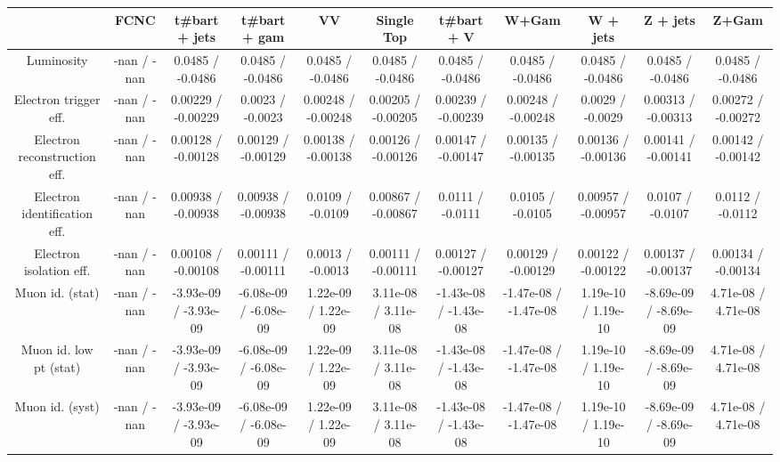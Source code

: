 \begin{table}[htbp]
\begin{center}
\footnotesize
\begin{tabular}{|c|c|c|c|c|c|c|c|c|c|c|}
\hline 
      & FCNC      & t#bar{t} + jets      & t#bar{t} +  gam      & VV      & Single Top      & t#bar{t} + V      & W+Gam      & W + jets      & Z + jets      & Z+Gam \\ 
\hline 
  Luminosity & -nan / -nan & 0.0485 / -0.0486 & 0.0485 / -0.0486 & 0.0485 / -0.0486 & 0.0485 / -0.0486 & 0.0485 / -0.0486 & 0.0485 / -0.0486 & 0.0485 / -0.0486 & 0.0485 / -0.0486 & 0.0485 / -0.0486 \\ 
  Electron trigger eff. & -nan / -nan & 0.00229 / -0.00229 & 0.0023 / -0.0023 & 0.00248 / -0.00248 & 0.00205 / -0.00205 & 0.00239 / -0.00239 & 0.00248 / -0.00248 & 0.0029 / -0.0029 & 0.00313 / -0.00313 & 0.00272 / -0.00272 \\ 
  Electron reconstruction eff. & -nan / -nan & 0.00128 / -0.00128 & 0.00129 / -0.00129 & 0.00138 / -0.00138 & 0.00126 / -0.00126 & 0.00147 / -0.00147 & 0.00135 / -0.00135 & 0.00136 / -0.00136 & 0.00141 / -0.00141 & 0.00142 / -0.00142 \\ 
  Electron identification eff. & -nan / -nan & 0.00938 / -0.00938 & 0.00938 / -0.00938 & 0.0109 / -0.0109 & 0.00867 / -0.00867 & 0.0111 / -0.0111 & 0.0105 / -0.0105 & 0.00957 / -0.00957 & 0.0107 / -0.0107 & 0.0112 / -0.0112 \\ 
  Electron isolation eff. & -nan / -nan & 0.00108 / -0.00108 & 0.00111 / -0.00111 & 0.0013 / -0.0013 & 0.00111 / -0.00111 & 0.00127 / -0.00127 & 0.00129 / -0.00129 & 0.00122 / -0.00122 & 0.00137 / -0.00137 & 0.00134 / -0.00134 \\ 
  Muon id. (stat) & -nan / -nan & -3.93e-09 / -3.93e-09 & -6.08e-09 / -6.08e-09 & 1.22e-09 / 1.22e-09 & 3.11e-08 / 3.11e-08 & -1.43e-08 / -1.43e-08 & -1.47e-08 / -1.47e-08 & 1.19e-10 / 1.19e-10 & -8.69e-09 / -8.69e-09 & 4.71e-08 / 4.71e-08 \\ 
  Muon id. low pt (stat) & -nan / -nan & -3.93e-09 / -3.93e-09 & -6.08e-09 / -6.08e-09 & 1.22e-09 / 1.22e-09 & 3.11e-08 / 3.11e-08 & -1.43e-08 / -1.43e-08 & -1.47e-08 / -1.47e-08 & 1.19e-10 / 1.19e-10 & -8.69e-09 / -8.69e-09 & 4.71e-08 / 4.71e-08 \\ 
  Muon id. (syst) & -nan / -nan & -3.93e-09 / -3.93e-09 & -6.08e-09 / -6.08e-09 & 1.22e-09 / 1.22e-09 & 3.11e-08 / 3.11e-08 & -1.43e-08 / -1.43e-08 & -1.47e-08 / -1.47e-08 & 1.19e-10 / 1.19e-10 & -8.69e-09 / -8.69e-09 & 4.71e-08 / 4.71e-08 \\ 

\end{tabular}
\end{center}
\end{table}
